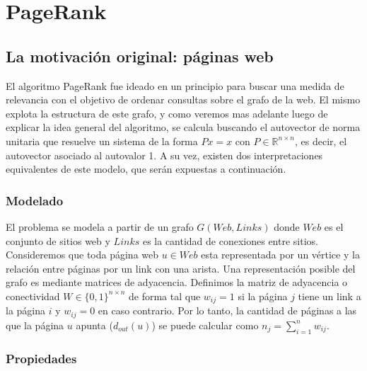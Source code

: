 \section{PageRank}

\subsection{La motivación original: páginas web}

El algoritmo PageRank fue ideado en un principio para buscar una medida de relevancia con el objetivo de ordenar consultas sobre el grafo de la web. El mismo explota la estructura de este grafo, y como veremos mas adelante luego de explicar la idea general del algoritmo, se calcula buscando el autovector de norma unitaria que resuelve un sistema de la forma $Px = x$ con $P\in \mathbb{R}^{n \times n}$, es decir, el autovector asociado al autovalor 1. A su vez, existen dos interpretaciones equivalentes de este modelo, que serán expuestas a continuación.

\subsubsection{Modelado}

El problema se modela a partir de un grafo $G(Web,Links)$ donde $Web$ es el conjunto de sitios web y $Links$ es la cantidad de conexiones entre sitios. Consideremos que toda página web $u \in Web$ esta representada por un vértice y la relación entre páginas por un link con una arista. Una representación posible del grafo es mediante matrices de adyacencia. Definimos la matriz de adyacencia o conectividad $W \in \{0,1\}^{n \times n}$ de forma tal que $w_{ij} = 1$ si la página $j$ tiene un link a la página $i$ y $w_{ij} = 0$ en caso contrario. Por lo tanto, la cantidad de páginas a las que la página $u$ apunta ($d_{out}(u)$) se puede calcular como $n_j = \sum_{i=1}^{n} w_{ij}$.

\subsubsection{Propiedades}

